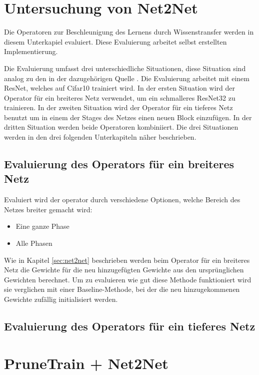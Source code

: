 \section{Untersuchung von Net2Net}\label{sec:net2netexperimente}
Die Operatoren zur Beschleunigung des Lernens durch Wissenstransfer werden in diesem Unterkapiel evaluiert. Diese Evaluierung arbeitet selbst erstellten Implementierung.

Die Evaluierung umfasst drei unterschiedliche Situationen, diese Situation sind analog zu den in der dazugehörigen Quelle \cite{net2net}. Die Evaluierung arbeitet mit einem ResNet, welches auf Cifar10 trainiert wird. In der ersten Situation wird der Operator für ein breiteres Netz verwendet, um ein schmalleres ResNet32 zu trainieren. In der zweiten Situation wird der Operator für ein tieferes Netz benutzt um in einem der Stages des Netzes einen neuen Block einzufügen. In der dritten Situation werden beide Operatoren kombiniiert.
Die drei Situationen werden in den drei folgenden Unterkapiteln näher beschrieben.

\subsection{Evaluierung des Operators für ein breiteres Netz}
Evaluiert wird der operator durch verschiedene Optionen, welche Bereich des Netzes breiter gemacht wird:
\begin{itemize}
 \item Eine ganze Phase
 \item Alle Phasen
\end{itemize}
Wie in Kapitel \ref{sec:net2net} beschrieben werden beim Operator für ein breiteres Netz die Gewichte für die neu hinzugefügten Gewichte aus den ursprünglichen Gewichten berechnet. Um zu evaluieren wie gut diese Methode funktioniert wird sie verglichen mit einer Baseline-Methode, bei der die neu hinzugekommenen Gewichte zufällig initialisiert werden.
\subsection{Evaluierung des Operators für ein tieferes Netz}

\color{black}



\section{PruneTrain + Net2Net}\label{sec:ptpnet2net}

